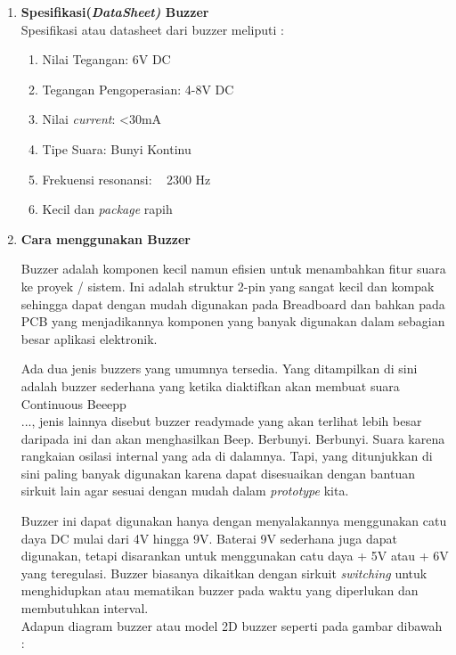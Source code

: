 \begin{enumerate}
\item \textbf{Spesifikasi(\textit{DataSheet)} Buzzer}\\
Spesifikasi atau datasheet dari buzzer meliputi :
\begin{enumerate}
    \item Nilai Tegangan: 6V DC
    \item Tegangan Pengoperasian: 4-8V DC
    \item Nilai \textit{current}: <30mA
    \item Tipe Suara: Bunyi Kontinu
    \item Frekuensi resonansi: ~ 2300 Hz
    \item Kecil dan \textit{package} rapih
\end{enumerate}

\item \textbf{Cara menggunakan Buzzer}\\
\par Buzzer adalah komponen kecil namun efisien untuk menambahkan fitur suara ke proyek / sistem. Ini adalah struktur 2-pin yang sangat kecil dan kompak sehingga dapat dengan mudah digunakan pada Breadboard dan bahkan pada PCB yang menjadikannya komponen yang banyak digunakan dalam sebagian besar aplikasi elektronik.

\par Ada dua jenis buzzers yang umumnya tersedia. Yang ditampilkan di sini adalah buzzer sederhana yang ketika diaktifkan akan membuat suara Continuous Beeepp\\..., jenis lainnya disebut buzzer readymade yang akan terlihat lebih besar daripada ini dan akan menghasilkan Beep. Berbunyi. Berbunyi. Suara karena rangkaian osilasi internal yang ada di dalamnya. Tapi, yang ditunjukkan di sini paling banyak digunakan karena dapat disesuaikan dengan bantuan sirkuit lain agar sesuai dengan mudah dalam \textit{prototype} kita.

\par Buzzer ini dapat digunakan hanya dengan menyalakannya menggunakan catu daya DC mulai dari 4V hingga 9V. Baterai 9V sederhana juga dapat digunakan, tetapi disarankan untuk menggunakan catu daya + 5V atau + 6V yang teregulasi. Buzzer biasanya dikaitkan dengan sirkuit \textit{switching} untuk menghidupkan atau mematikan buzzer pada waktu yang diperlukan dan membutuhkan interval.\\ Adapun diagram buzzer atau model 2D buzzer seperti pada gambar dibawah :


\end{enumerate}
